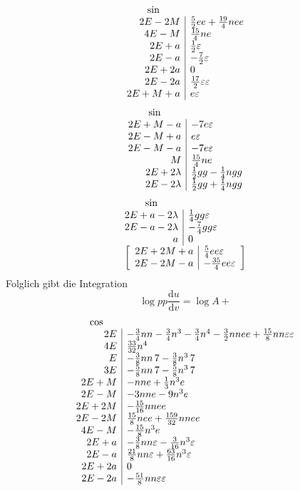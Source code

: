 \[
\begin{array}{r|l}
\multicolumn{1}{c}{\sin}&\\
2E-2M&\tfrac52ee+\tfrac{19}{4}nee\\
4E-M&\tfrac{15}{4}ne\\
2E+a&\tfrac12\varepsilon\\
2E-a&-\tfrac72\varepsilon\\
2E+2a&0\\
2E-2a&\tfrac{17}{2}\varepsilon\varepsilon\\
2E+M+a&e\varepsilon
\end{array}
\]
\clearpage{}\thispagestyle{VIIPrinted635}
\[
\begin{array}{r|l}
\multicolumn{1}{c}{\sin}&\\
2E+M-a&-7e\varepsilon\\
2E-M+a&e\varepsilon\\
2E-M-a&-7e\varepsilon\\
M&\tfrac{15}{4}ne\\
2E+2\lambda&\tfrac12gg-\tfrac14ngg\\
2E-2\lambda&\tfrac12gg+\tfrac14ngg
\end{array}
\]
\[
\begin{array}{r|l}
\multicolumn{1}{c}{\sin}&\\
2E+a-2\lambda&\tfrac14gg\varepsilon\\
2E-a-2\lambda&-\tfrac74gg\varepsilon\\
a&0\\
\multicolumn{2}{c}{\left[\begin{array}{r|l}
2E+2M+a&\tfrac54ee\varepsilon\\
2E-2M-a&-\tfrac{35}{4}ee\varepsilon
\end{array}\right]}
\end{array}
\]
\noindent Folglich gibt die Integration
\[
\log pp\frac{\mathrm du}{\mathrm dv}=\log A+
\]
\[
\begin{array}{r|l}
\multicolumn{1}{c}{\cos}&\\
2E&-\tfrac34nn-\tfrac34n^3-\tfrac34n^4-\tfrac32nnee+\tfrac{15}{8}nn\varepsilon\varepsilon\\
4E&\tfrac{33}{32}n^4\\
E&-\tfrac38nn\,7-\tfrac38n^3\,7\\
3E&-\tfrac58nn\,7-\tfrac58n^3\,7\\
2E+M&-nne+\tfrac13n^3e\\
2E-M&-3nne-9n^3e\\
2E+2M&-\tfrac{15}{16}nnee\\
2E-2M&\tfrac{15}{8}nee+\tfrac{159}{32}nnee\\
4E-M&-\tfrac{15}{8}n^3e\\
2E+a&-\tfrac38nn\varepsilon-\tfrac{3}{16}n^3\varepsilon\\
2E-a&\tfrac{21}{8}nn\varepsilon+\tfrac{63}{16}n^3\varepsilon\\
2E+2a&0\\
2E-2a&-\tfrac{51}{8}nn\varepsilon\varepsilon
\end{array}
\]
